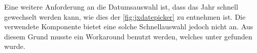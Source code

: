 Eine weitere Anforderung an die Datumsauswahl ist, dass das Jahr schnell gewechselt werden kann, wie dies der \autoref{fig:jxdatepicker} zu entnehmen ist.
Die verwendete Komponente  bietet eine solche Schnellauswahl  jedoch nicht an.
Aus diesem Grund musste ein Workaround benutzt werden, welches unter \autocite{so-jxdatepicker} gefunden wurde.
%
%

